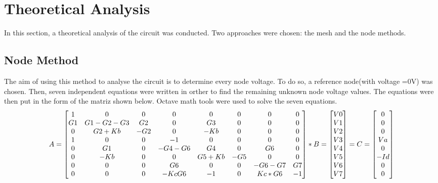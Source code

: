 \documentclass[11pt,a4paper,twoside]{article}
\begin{document}
\section {Theoretical Analysis}


In this section, a theoretical analysis of the circuit was conducted. Two approaches were chosen: the mesh and the node methods.

\subsection{Node Method}

The aim of using this method to analyse the circuit is to determine every node voltage. To do so, a reference node(with voltage =0V) was chosen. Then, seven independent equations were written in orther to find the remaining unknown node voltage values. The equations were then put in the form of the matriz shown below. Octave math tools were used to solve the seven equations.\\

\begin{equation}
 $$A=\begin{bmatrix}
1 & 0 & 0 & 0 & 0 & 0 & 0 & 0\\
   
G1 & G1-G2-G3 & G2 & 0 & G3 & 0 & 0 & 0\\

0 & G2+Kb & -G2 & 0 & -Kb & 0 & 0 & 0\\

1 & 0 & 0 & -1 & 0 & 0 & 0 & 0\\

0 & G1 & 0 & -G4-G6 & G4 & 0 & G6 & 0\\

0 & -Kb & 0 & 0 & G5+Kb & -G5 & 0 & 0\\

0 & 0 & 0 & G6 & 0 & 0 & -G6-G7 & G7\\

0 & 0 & 0 & -KcG6 & -1 & 0 & Kc*G6 & -1
\end{bmatrix}*B= 
\begin{bmatrix}
V0\\
V1\\
V2\\
V3\\
V4\\
V5\\
V6\\
V7
\end{bmatrix} = C= 
\begin{bmatrix}
0\\
0\\
0\\
Va\\
0\\
-Id\\
0\\
0
\end{bmatrix}
$$
\end{equation}
\end{document}
